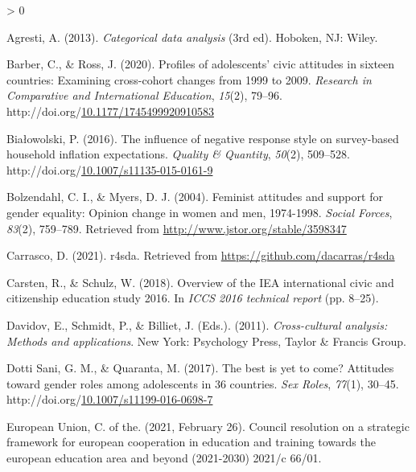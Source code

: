 \documentclass[12pt,a4paper,oneside]{reedthesis}
\newlength{\cslhangindent}
\newenvironment{CSLReferences}[2] %
 {%
  \setlength{\parindent}{0pt}
  \ifodd #1 \everypar{\setlength{\hangindent}{\cslhangindent}}\ignorespaces\fi
  \ifnum #2 > 0
  \setlength{\parskip}{#2\baselineskip}
  \fi
 }%
 {}
\begin{document}
\hypertarget{refs}{}
\begin{CSLReferences}{1}{0}
\leavevmode\hypertarget{ref-agresti_categorical_2013}{}%
Agresti, A. (2013). \emph{Categorical data analysis} (3rd ed). Hoboken, {NJ}: Wiley.

\leavevmode\hypertarget{ref-barber_profiles_2020}{}%
Barber, C., \& Ross, J. (2020). Profiles of adolescents' civic attitudes in sixteen countries: Examining cross-cohort changes from 1999 to 2009. \emph{Research in Comparative and International Education}, \emph{15}(2), 79--96. http://doi.org/\href{https://doi.org/10.1177/1745499920910583}{10.1177/1745499920910583}

\leavevmode\hypertarget{ref-bialowolski_influence_2016}{}%
Białowolski, P. (2016). The influence of negative response style on survey-based household inflation expectations. \emph{Quality \& Quantity}, \emph{50}(2), 509--528. http://doi.org/\href{https://doi.org/10.1007/s11135-015-0161-9}{10.1007/s11135-015-0161-9}

\leavevmode\hypertarget{ref-bolzendahl_feminist_2004}{}%
Bolzendahl, C. I., \& Myers, D. J. (2004). Feminist attitudes and support for gender equality: Opinion change in women and men, 1974-1998. \emph{Social Forces}, \emph{83}(2), 759--789. Retrieved from \url{http://www.jstor.org/stable/3598347}

\leavevmode\hypertarget{ref-carrasco_r4sda_2021}{}%
Carrasco, D. (2021). r4sda. Retrieved from \url{https://github.com/dacarras/r4sda}

\leavevmode\hypertarget{ref-carsten_overview_2018}{}%
Carsten, R., \& Schulz, W. (2018). Overview of the {IEA} international civic and citizenship education study 2016. In \emph{{ICCS} 2016 technical report} (pp. 8--25).

\leavevmode\hypertarget{ref-davidov_cross-cultural_2011}{}%
Davidov, E., Schmidt, P., \& Billiet, J. (Eds.). (2011). \emph{Cross-cultural analysis: Methods and applications}. New York: Psychology Press, Taylor \& Francis Group.

\leavevmode\hypertarget{ref-dotti_sani_best_2017}{}%
Dotti Sani, G. M., \& Quaranta, M. (2017). The best is yet to come? Attitudes toward gender roles among adolescents in 36 countries. \emph{Sex Roles}, \emph{77}(1), 30--45. http://doi.org/\href{https://doi.org/10.1007/s11199-016-0698-7}{10.1007/s11199-016-0698-7}

\leavevmode\hypertarget{ref-council_of_the_european_union_council_2021}{}%
European Union, C. of the. (2021, February 26). Council resolution on a strategic framework for european cooperation in education and training towards the european education area and beyond (2021-2030) 2021/c 66/01.


\end{CSLReferences}
\end{document}
